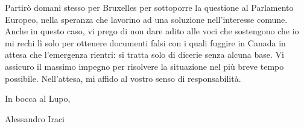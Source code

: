 \documentclass{letter}
\begin{document}
\begin{letter}{}
Partirò domani stesso per Bruxelles per sottoporre la questione al Parlamento Europeo, nella speranza che lavorino ad una soluzione nell'interesse comune. Anche in questo caso, vi prego di non dare adito alle voci che sostengono che io mi rechi lì solo per ottenere documenti falsi con i quali fuggire in Canada in attesa che l'emergenza rientri: si tratta solo di dicerie senza alcuna base. Vi assicuro il massimo impegno per risolvere la situazione nel più breve tempo possibile. Nell'attesa, mi affido al vostro senso di responsabilità.

In bocca al Lupo,

\bigskip

\noindent Alessandro Iraci

\end{letter}
\end{document}
